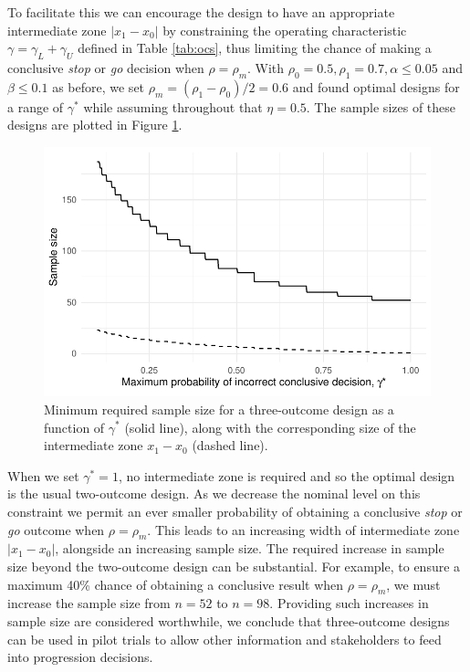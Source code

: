 \documentclass{bmcart}
\begin{document}
To facilitate this we can encourage the design to have an appropriate intermediate zone $| x_1 - x_0|$ by constraining the operating characteristic $\gamma = \gamma_L + \gamma_U$ defined in Table \ref{tab:ocs}, thus limiting the chance of making a conclusive \emph{stop} or \emph{go} decision when $\rho = \rho_m$. With $\rho_0 = 0.5, \rho_1 = 0.7, \alpha \leq 0.05$ and $\beta \leq 0.1$ as before, we set $\rho_m = (\rho_1 - \rho_0)/2 = 0.6$ and found optimal designs for a range of $\gamma^*$ while assuming throughout that $\eta = 0.5$. The sample sizes of these designs are plotted in Figure \ref{fig:gamma_ns}.

\begin{figure}
\centering
\includegraphics[scale=0.8]{./figures/gamma_ns}
\caption{Minimum required sample size for a three-outcome design as a function of $\gamma^*$ (solid line), along with the corresponding size of the intermediate zone $x_1 - x_0$ (dashed line).}
\label{fig:gamma_ns}
\end{figure}

When we set $\gamma^* = 1$, no intermediate zone is required and so the optimal design is the usual two-outcome design. As we decrease the nominal level on this constraint we permit an ever smaller probability of obtaining a conclusive \emph{stop} or \emph{go} outcome when $\rho = \rho_m$. This leads to an increasing width of intermediate zone $|x_1 - x_0|$, alongside an increasing sample size. The required increase in sample size beyond the two-outcome design can be substantial. For example, to ensure a maximum 40\% chance of obtaining a conclusive result when $\rho = \rho_m$, we must increase the sample size from $n = 52$ to $n = 98$. Providing such increases in sample size are considered worthwhile, we conclude that three-outcome designs can be used in pilot trials to allow other information and stakeholders to feed into progression decisions.
\end{document}

